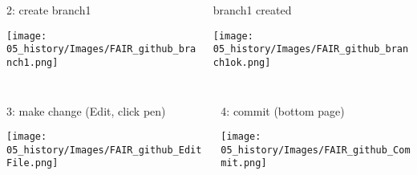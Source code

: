 \begin{frame}{ }
\begin{columns}
\begin{column}{0.5\textwidth}
\begin{exampleblock}{2: create branch1}
    \begin{center}
    \texttt{[image: 05\_history/Images/FAIR\_github\_branch1.png]}
    \end{center}
\end{exampleblock}
\end{column}
\begin{column}{0.46\textwidth}
\begin{exampleblock}{branch1 created}
    \begin{center}
    \texttt{[image: 05\_history/Images/FAIR\_github\_branch1ok.png]}
    \end{center}
\end{exampleblock}
\end{column}
\end{columns}
\end{frame}
\begin{frame}{ }
\begin{columns}
\begin{column}{0.48\textwidth}
\begin{exampleblock}{3: make change (Edit, click pen)}
    \begin{center}
    \texttt{[image: 05\_history/Images/FAIR\_github\_EditFile.png]}
    \end{center}
\end{exampleblock}
\end{column}
\begin{column}{0.48\textwidth}
\begin{exampleblock}{4: commit (bottom page)}
    \begin{center}
    \texttt{[image: 05\_history/Images/FAIR\_github\_Commit.png]}
    \end{center}
\end{exampleblock}
\end{column}
\end{columns}
\end{frame}
